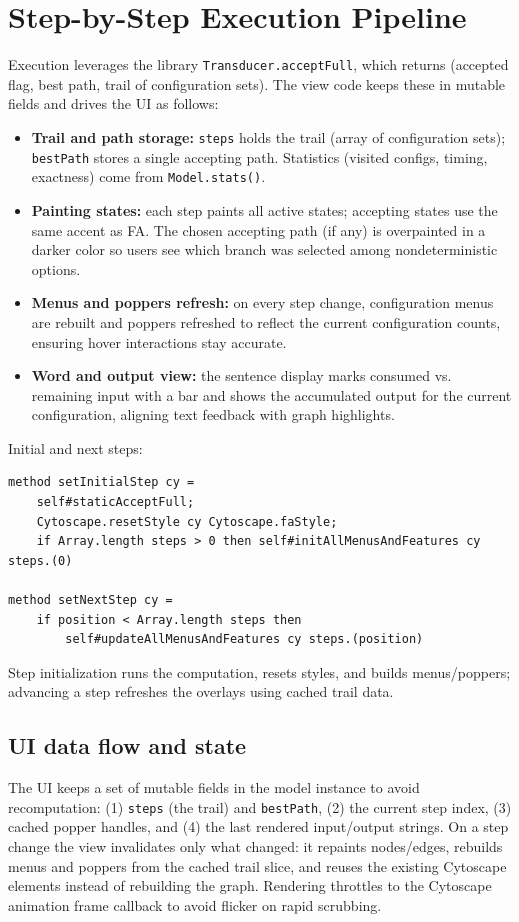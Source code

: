 \section{Step-by-Step Execution Pipeline}
\label{sec:oflat_stepbystep}
Execution leverages the library \texttt{Transducer.acceptFull}, which returns (accepted flag, best path, trail of
configuration sets). The view code keeps these in mutable fields and drives the UI as follows:
\begin{itemize}
  \item \textbf{Trail and path storage:} \texttt{steps} holds the trail (array of configuration sets); \texttt{bestPath}
	  stores a single accepting path. Statistics (visited configs, timing, exactness) come from \texttt{Model.stats()}.
  \item \textbf{Painting states:} each step paints all active states; accepting states use the same accent as FA. The
	  chosen accepting path (if any) is overpainted in a darker color so users see which branch was selected among
	  nondeterministic options.
  \item \textbf{Menus and poppers refresh:} on every step change, configuration menus are rebuilt and poppers refreshed to
	  reflect the current configuration counts, ensuring hover interactions stay accurate.
  \item \textbf{Word and output view:} the sentence display marks consumed vs. remaining input with a bar and shows the
	  accumulated output for the current configuration, aligning text feedback with graph highlights.
\end{itemize}

Initial and next steps:
\begin{verbatim}
method setInitialStep cy =
    self#staticAcceptFull;
    Cytoscape.resetStyle cy Cytoscape.faStyle;
    if Array.length steps > 0 then self#initAllMenusAndFeatures cy steps.(0)

method setNextStep cy =
    if position < Array.length steps then
        self#updateAllMenusAndFeatures cy steps.(position)
\end{verbatim}
Step initialization runs the computation, resets styles, and builds menus/poppers; 
advancing a step refreshes the overlays using cached trail data.

\subsection*{UI data flow and state}
The UI keeps a set of mutable fields in the model instance to avoid recomputation: (1) \texttt{steps} (the trail) and
	\texttt{bestPath}, (2) the current step index, (3) cached popper handles, and (4) the last rendered input/output strings.
On a step change the view invalidates only what changed: it repaints nodes/edges, rebuilds menus and poppers from the cached
trail slice, and reuses the existing Cytoscape elements instead of rebuilding the graph. Rendering throttles to the Cytoscape
animation frame callback to avoid flicker on rapid scrubbing.

